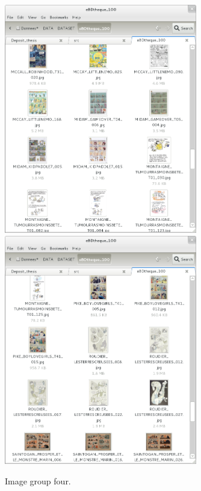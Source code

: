   \begin{figure}[h!]  %
    \centering
    
    \includegraphics[trim= 5px 10px 30px 152px, clip, width=0.75\textwidth]{thumb_07.png}
    \\
    \includegraphics[trim= 5px 10px 30px 152px, clip, width=0.75\textwidth]{thumb_08.png}
    \caption{Image group four.}
    \label{fig:app:7_8}
  \end{figure}


